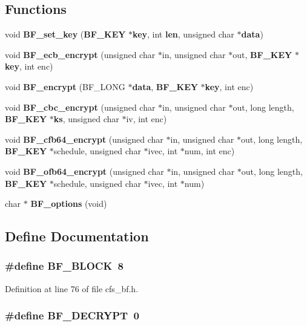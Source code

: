 \subsection*{Functions}
\begin{CompactItemize}
\item 
void {\bf BF\_\-set\_\-key} ({\bf BF\_\-KEY} $\ast${\bf key}, int {\bf len}, unsigned char $\ast${\bf data})
\item 
void {\bf BF\_\-ecb\_\-encrypt} (unsigned char $\ast$in, unsigned char $\ast$out, {\bf BF\_\-KEY} $\ast${\bf key}, int enc)
\item 
void {\bf BF\_\-encrypt} (BF\_\-LONG $\ast${\bf data}, {\bf BF\_\-KEY} $\ast${\bf key}, int enc)
\item 
void {\bf BF\_\-cbc\_\-encrypt} (unsigned char $\ast$in, unsigned char $\ast$out, long length, {\bf BF\_\-KEY} $\ast${\bf ks}, unsigned char $\ast$iv, int enc)
\item 
void {\bf BF\_\-cfb64\_\-encrypt} (unsigned char $\ast$in, unsigned char $\ast$out, long length, {\bf BF\_\-KEY} $\ast$schedule, unsigned char $\ast$ivec, int $\ast$num, int enc)
\item 
void {\bf BF\_\-ofb64\_\-encrypt} (unsigned char $\ast$in, unsigned char $\ast$out, long length, {\bf BF\_\-KEY} $\ast$schedule, unsigned char $\ast$ivec, int $\ast$num)
\item 
char $\ast$ {\bf BF\_\-options} (void)
\end{CompactItemize}


\subsection{Define Documentation}
\subsubsection{\setlength{\rightskip}{0pt plus 5cm}\#define BF\_\-BLOCK\ 8}\label{cfs__bf_8h_a4}




Definition at line 76 of file cfs\_\-bf.h.
\subsubsection{\setlength{\rightskip}{0pt plus 5cm}\#define BF\_\-DECRYPT\ 0}\label{cfs__bf_8h_a1}




